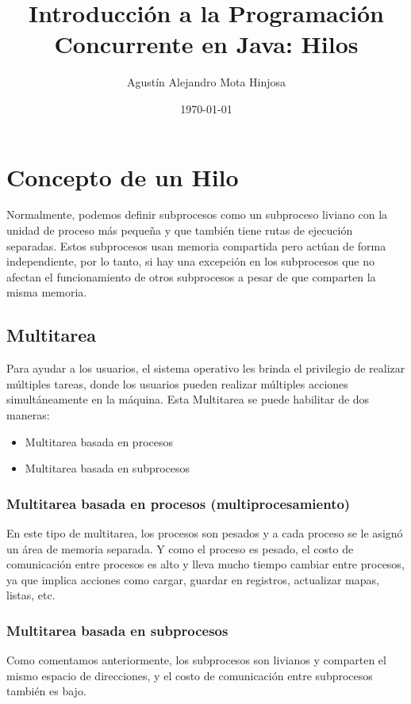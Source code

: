 \documentclass{article}
\title{Introducción a la Programación Concurrente en Java: Hilos}
\author{Agustín Alejandro Mota Hinjosa}
\date{\today}
\begin{document}
\maketitle

\section{Concepto de un Hilo}%
\label{sec:label}
Normalmente, podemos definir subprocesos como un subproceso liviano con la unidad de proceso más pequeña y que también tiene rutas de ejecución separadas. Estos subprocesos usan memoria compartida pero actúan de forma independiente, por lo tanto, si hay una excepción en los subprocesos que no afectan el funcionamiento de otros subprocesos a pesar de que comparten la misma memoria.

\subsection{Multitarea}
Para ayudar a los usuarios, el sistema operativo les brinda el privilegio de realizar múltiples tareas, donde los usuarios pueden realizar múltiples acciones simultáneamente en la máquina. Esta Multitarea se puede habilitar de dos maneras:

\begin{itemize}
  \item Multitarea basada en procesos
  \item Multitarea basada en subprocesos
\end{itemize}

\subsubsection{Multitarea basada en procesos (multiprocesamiento)}

En este tipo de multitarea, los procesos son pesados y a cada proceso se le asignó un área de memoria separada. Y como el proceso es pesado, el costo de comunicación entre procesos es alto y lleva mucho tiempo cambiar entre procesos, ya que implica acciones como cargar, guardar en registros, actualizar mapas, listas, etc.

\subsubsection{Multitarea basada en subprocesos}

Como comentamos anteriormente, los subprocesos son livianos y comparten el mismo espacio de direcciones, y el costo de comunicación entre subprocesos también es bajo.
\end{document}
